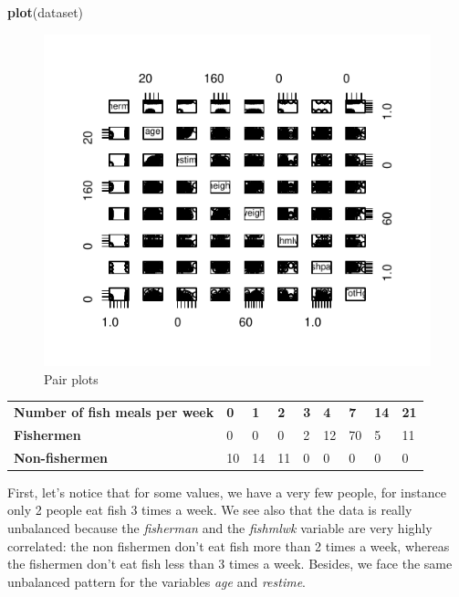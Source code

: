 \documentclass[12pt,]{article}
\newenvironment{Shaded}{\begin{snugshade}}{\end{snugshade}}
\newcommand{\KeywordTok}[1]{\textcolor[rgb]{0.13,0.29,0.53}{\textbf{#1}}}
\newcommand{\NormalTok}[1]{#1}
\begin{document}
\begin{Shaded}
\begin{Highlighting}[]
\KeywordTok{plot}\NormalTok{(dataset)}
\end{Highlighting}
\end{Shaded}

\begin{figure}
\centering
\includegraphics{Report_files/figure-latex/unnamed-chunk-7-1.pdf}
\caption{Pair plots}
\end{figure}

\begin{longtable}[]{@{}lllllllll@{}}
\toprule
\textbf{Number of fish meals per week} & \textbf{0} & \textbf{1} &
\textbf{2} & \textbf{3} & \textbf{4} & \textbf{7} & \textbf{14} &
\textbf{21}\tabularnewline
\textbf{Fishermen} & 0 & 0 & 0 & 2 & 12 & 70 & 5 & 11\tabularnewline
\textbf{Non-fishermen} & 10 & 14 & 11 & 0 & 0 & 0 & 0 & 0\tabularnewline
\bottomrule
\end{longtable}

First, let's notice that for some values, we have a very few people, for
instance only 2 people eat fish 3 times a week. We see also that the
data is really unbalanced because the \emph{fisherman} and the
\emph{fishmlwk} variable are very highly correlated: the non fishermen
don't eat fish more than 2 times a week, whereas the fishermen don't eat
fish less than 3 times a week. Besides, we face the same unbalanced
pattern for the variables \emph{age} and \emph{restime}.
\end{document}

